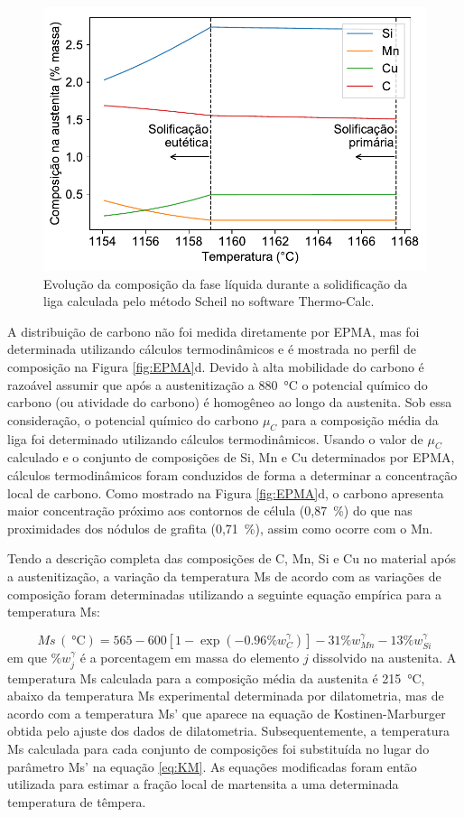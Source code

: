 \begin{figure}
  \centering
  \includegraphics[width=.8\textwidth]{img/thermo-calc/scheil_austenita.pdf}
  \caption{Evolução da composição da fase líquida durante a solidificação da liga calculada pelo método Scheil no software Thermo-Calc\textregistered{}.}
  \label{fig:scheil}
\end{figure}

A distribuição de carbono não foi medida diretamente por EPMA, mas foi determinada utilizando cálculos termodinâmicos e é mostrada no perfil de composição na Figura \ref{fig:EPMA}d. Devido à alta mobilidade do carbono é razoável assumir que após a austenitização a \SI{880}{\degreeCelsius} o potencial químico do carbono (ou atividade do carbono) é homogêneo ao longo da austenita. Sob essa consideração, o potencial químico do carbono $\mu_C$ para a composição média da liga foi determinado utilizando cálculos termodinâmicos. Usando o valor de $\mu_C$ calculado e o conjunto de composições de Si, Mn e Cu determinados por EPMA, cálculos termodinâmicos foram conduzidos de forma a determinar a concentração local de carbono. Como mostrado na Figura \ref{fig:EPMA}d, o carbono apresenta maior concentração próximo aos contornos de célula (0,87~\%) do que nas proximidades dos nódulos de grafita (0,71~\%), assim como ocorre com o Mn.

Tendo a descrição completa das composições de C, Mn, Si e Cu no material após a austenitização, a variação da temperatura Ms de acordo com as variações de composição foram determinadas utilizando a seguinte equação empírica para a temperatura Ms\cite{VanBohemen2012}:

\begin{equation}
  Ms\,(\SI{}{\degreeCelsius}) = 565 - 600 \left[1 - \exp \left( -0.96 \%w_C^\gamma \right)\right] - 31 \%w_{Mn}^\gamma - 13 \%w_{Si}^\gamma
  \label{eq:MsVanBohemen}
\end{equation}
%
em que $\%w_j^\gamma$ é a porcentagem em massa do elemento $j$ dissolvido na austenita. A temperatura Ms calculada para a composição média da austenita é \SI{215}{\degreeCelsius}, abaixo da temperatura Ms experimental determinada por dilatometria, mas de acordo com a temperatura Ms' que aparece na equação de Kostinen-Marburger obtida pelo ajuste dos dados de dilatometria.
Subsequentemente, a temperatura Ms calculada para cada conjunto de composições foi substituída no lugar do parâmetro Ms' na equação \ref{eq:KM}. As equações modificadas foram então utilizada para estimar a fração local de martensita a uma determinada temperatura de têmpera. 

